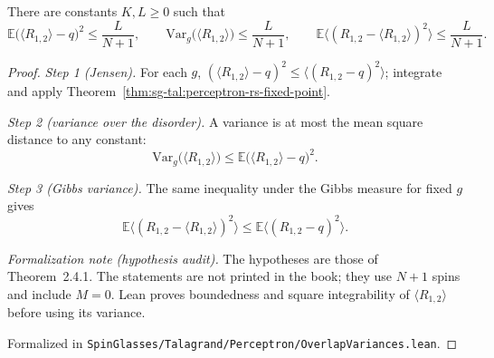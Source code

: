 \begin{theorem}\label{thm:sg-tal:perceptron-overlap-variances}
  \leanok
There are constants $K,L\ge0$ such that
\[
 \mathbb E\bigl(\langle R_{1,2}\rangle-q\bigr)^2\le\frac{L}{N+1},\qquad
 \mathrm{Var}_g\bigl(\langle R_{1,2}\rangle\bigr)\le\frac{L}{N+1},\qquad
 \mathbb E\bigl\langle(R_{1,2}-\langle R_{1,2}\rangle)^2\bigr\rangle\le\frac{L}{N+1}.
\]
\end{theorem}
\begin{proof}
\leanok
\emph{Step 1 (Jensen).} For each $g$, $(\langle R_{1,2}\rangle-q)^2\le\langle(R_{1,2}-q)^2\rangle$; integrate and
apply Theorem~\ref{thm:sg-tal:perceptron-rs-fixed-point}.

\emph{Step 2 (variance over the disorder).} A variance is at most the mean square distance to any constant:
\[
 \mathrm{Var}_g\bigl(\langle R_{1,2}\rangle\bigr)\le\mathbb E\bigl(\langle R_{1,2}\rangle-q\bigr)^2 .
\]

\emph{Step 3 (Gibbs variance).} The same inequality under the Gibbs measure for fixed $g$ gives
\[
 \mathbb E\bigl\langle(R_{1,2}-\langle R_{1,2}\rangle)^2\bigr\rangle\le\mathbb E\bigl\langle(R_{1,2}-q)^2\bigr\rangle .
\]

\emph{Formalization note (hypothesis audit).} The hypotheses are those of Theorem~2.4.1. The statements are not
printed in the book; they use $N+1$ spins and include $M=0$. Lean proves boundedness and square integrability of
$\langle R_{1,2}\rangle$ before using its variance.

Formalized in \texttt{SpinGlasses/Talagrand/Perceptron/OverlapVariances.lean}.
\end{proof}

